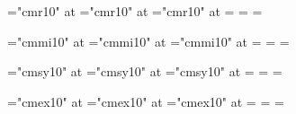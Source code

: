 \def\hugesans   {\font\zfontz="Arial" at \hugefont   \zfontz}
\def\largesans  {\font\zfontz="Arial" at \largefont  \zfontz}
\def\normalsans {\font\zfontz="Arial" at \normalfont \zfontz}
\def\smallsans  {\font\zfontz="Arial" at \smallfont  \zfontz}
\def\tinysans   {\font\zfontz="Arial" at \tinyfont   \zfontz}

\def\hugerm   {\font\zfontz="cmr10" at \hugefont   \zfontz}
\def\largerm  {\font\zfontz="cmr10" at \largefont  \zfontz}
\def\normalrm {\font\zfontz="cmr10" at \normalfont \zfontz}
\def\smallrm  {\font\zfontz="cmr10" at \smallfont  \zfontz}
\def\tinyrm   {\font\zfontz="cmr10" at \tinyfont   \zfontz}

\font\1="cmr10" at \largefont
\font\2="cmr10" at \normalfont
\font\3="cmr10" at \smallfont
{}=\1 =\2 =\3
\def\rm{\fam=0}

\def\hugemi   {\font\zfontz="cmmi10" at \hugefont   \zfontz}
\def\largemi  {\font\zfontz="cmmi10" at \largefont  \zfontz}
\def\normalmi {\font\zfontz="cmmi10" at \normalfont \zfontz}
\def\smallmi  {\font\zfontz="cmmi10" at \smallfont  \zfontz}
\def\tinymi   {\font\zfontz="cmmi10" at \tinyfont   \zfontz}

\font\1="cmmi10" at \largefont
\font\2="cmmi10" at \normalfont
\font\3="cmmi10" at \smallfont
{}=\1 =\2 =\3
\def\mit{\fam=1}

\def\hugesy   {\font\zfontz="cmsy10" at \hugefont   \zfontz}
\def\largesy  {\font\zfontz="cmsy10" at \largefont  \zfontz}
\def\normalsy {\font\zfontz="cmsy10" at \normalfont \zfontz}
\def\smallsy  {\font\zfontz="cmsy10" at \smallfont  \zfontz}
\def\tinysy   {\font\zfontz="cmsy10" at \tinyfont   \zfontz}

\font\1="cmsy10" at \largefont
\font\2="cmsy10" at \normalfont
\font\3="cmsy10" at \smallfont
{}=\1 =\2 =\3
\def\cal{\fam=2}

\def\hugeex   {\font\zfontz="cmex10" at \hugefont   \zfontz}
\def\largeex  {\font\zfontz="cmex10" at \largefont  \zfontz}
\def\normalex {\font\zfontz="cmex10" at \normalfont \zfontz}
\def\smallex  {\font\zfontz="cmex10" at \smallfont  \zfontz}
\def\tinyex   {\font\zfontz="cmex10" at \tinyfont   \zfontz}

\font\1="cmex10" at \largefont
\font\2="cmex10" at \normalfont
\font\3="cmex10" at \smallfont
{}=\1 =\2 =\3


